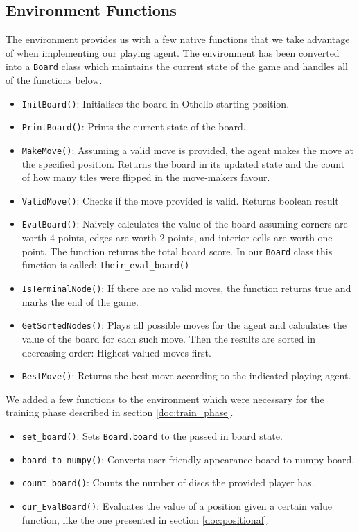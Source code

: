 \documentclass{article}
\begin{document}
\subsection{\label{doc:env_func}Environment Functions}
The environment provides us with a few native functions that we take advantage of when implementing our playing agent\cite{codes}. The environment has been converted into a \texttt{Board} class which maintains the current state of the game and handles all of the functions below.
\begin{itemize}
    \item \texttt{InitBoard()}: Initialises the board in Othello starting position.
    \item \texttt{PrintBoard()}: Prints the current state of the board.
    \item \texttt{MakeMove()}: Assuming a valid move is provided, the agent makes the move at the specified position. Returns the board in its updated state and the count of how many tiles were flipped in the move-makers favour.
    \item \texttt{ValidMove()}: Checks if the move provided is valid. Returns boolean result
    \item \texttt{EvalBoard()}: Naively calculates the value of the board assuming corners are worth 4 points, edges are worth 2 points, and interior cells are worth one point. The function returns the total board score. In our \texttt{Board} class this function is called: \texttt{their\_eval\_board()}
    \item \texttt{IsTerminalNode()}: If there are no valid moves, the function returns true and marks the end of the game.
    \item \texttt{GetSortedNodes()}: Plays all possible moves for the agent and calculates the value of the board for each such move. Then the results are sorted in decreasing order: Highest valued moves first.
    \item \texttt{BestMove()}: Returns the best move according to the indicated playing agent.
\end{itemize}
We added a few functions to the environment which were necessary for the training phase described in section \ref{doc:train_phase}.
\begin{itemize}
    \item \texttt{set\_board()}: Sets \texttt{Board.board} to the passed in board state.
    \item \texttt{board\_to\_numpy()}: Converts user friendly appearance board to numpy board.
    \item \texttt{count\_board()}: Counts the number of discs the provided player has.
    \item \texttt{our\_EvalBoard()}: Evaluates the value of a position given a certain value function, like the one presented in section \ref{doc:positional}.
\end{itemize}
\end{document}
